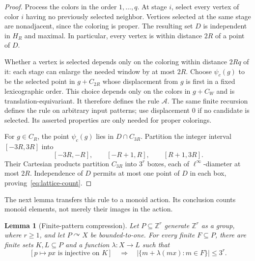 \documentclass[10pt,a4paper]{amsart}
\newtheorem{lemma}[theorem]{Lemma}
\newcommand{\ZZ}{\mathbb Z}
\newcommand{\act}{\curvearrowright}
\begin{document}
\begin{proof}
Process the colors in the order $1,\ldots,q$. At stage $i$, select every
vertex of color $i$ having no previously selected neighbor. Vertices
selected at the same stage are nonadjacent, since the coloring is proper.
The resulting set $D$ is independent in $H_R$ and maximal. In particular,
every vertex is within distance $2R$ of a point of $D$.

Whether a vertex is selected depends only on the coloring within distance
$2Rq$ of it: each stage can enlarge the needed window by at most $2R$.
Choose $\psi_c(g)$ to be the selected point in $g+C_{2R}$ whose displacement
from $g$ is first in a fixed lexicographic order. This choice depends only
on the colors in $g+C_W$ and is translation-equivariant. It therefore
defines the rule $\mathcal A$. The same finite recursion defines the rule
on arbitrary input patterns; use displacement $0$ if no candidate is
selected. Its asserted properties are only needed for proper colorings.

For $g\in C_R$, the point $\psi_c(g)$ lies in $D\cap C_{3R}$. Partition
the integer interval $[-3R,3R]$ into
\[
 [-3R,-R],\qquad [-R+1,R],\qquad [R+1,3R].
\]
Their Cartesian products partition $C_{3R}$ into $3^r$ boxes, each of
$\ell^\infty$-diameter at most $2R$. Independence of $D$ permits at most one
point of $D$ in each box, proving~\eqref{eq:lattice-count}.
\end{proof}

The next lemma transfers this rule to a monoid action. Its conclusion
counts monoid elements, not merely their images in the action.

\begin{lemma}[Finite-pattern compression]\label{lem:compression}
Let $P\subseteq\ZZ^r$ generate $\ZZ^r$ as a group, where $r\ge1$, and let
$P\act X$ be bounded-to-one. For every finite $F\subseteq P$, there are
finite sets $K,L\subseteq P$ and a function $\lambda:X\to L$ such that
\begin{equation}\label{eq:compression}
 \left[p\mapsto px\text{ is injective on }K\right]
 \quad\Longrightarrow\quad
 \bigl|\{m+\lambda(mx):m\in F\}\bigr|\le3^r.
\end{equation}
\end{lemma}
\end{document}
